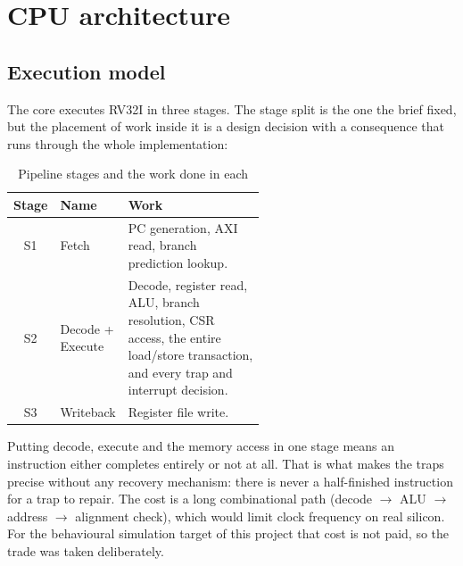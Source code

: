 \chapter{CPU architecture}
\label{ch:cpuarch}

\section{Execution model}

The core executes RV32I in three stages. The stage split is the one the brief
fixed, but the placement of work inside it is a design decision with a
consequence that runs through the whole implementation:

\begin{table}[H]
\centering
\caption{Pipeline stages and the work done in each}
\label{tab:stages}
\begin{tabular}{@{}clL{0.56\linewidth}@{}}
\toprule
\textbf{Stage} & \textbf{Name} & \textbf{Work} \\
\midrule
S1 & Fetch & PC generation,  AXI read, branch prediction lookup. \\
S2 & Decode + Execute & Decode, register read, ALU, branch resolution, CSR access,
     the entire load/store transaction, and every trap and interrupt decision. \\
S3 & Writeback & Register file write. \\
\bottomrule
\end{tabular}
\end{table}

Putting decode, execute and the memory access in one stage means an instruction
either completes entirely or not at all. That is what makes the traps precise
without any recovery mechanism: there is never a half-finished instruction for a
trap to repair. The cost is a long combinational path (decode $\to$ ALU $\to$
address $\to$ alignment check), which would limit clock frequency on real
silicon. For the behavioural simulation target of this project that cost is not
paid, so the trade was taken deliberately.

